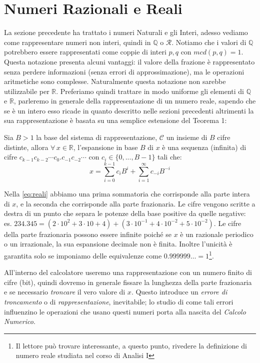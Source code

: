 \section{Numeri Razionali e Reali}

La sezione precedente ha trattato i numeri Naturali e gli Interi, adesso
vediamo come rappresentare numeri non interi, quindi in $\mathbb{Q}$ o
$\mathcal{R}$. Notiamo che i valori di $\mathbb{Q}$ potrebbero essere
rappresentati come coppie di interi $p, q$ con $mcd(p,q) = 1$. Questa notazione
presenta alcuni vantaggi: il valore della frazione è rappresentato senza
perdere informazioni (senza errori di approssimazione), ma le operazioni
aritmetiche sono complesse. Naturalmente questa notazione non sarebbe
utilizzabile per $\mathbb{R}$. Preferiamo quindi trattare in modo uniforme gli
elementi di $\mathbb{Q}$ e $\mathbb{R}$, parleremo in generale della
rappresentazione di un numero reale, sapendo che se è un intero esso ricade in
quanto descritto nelle sezioni precedenti altrimenti la sua rappresentazione è
basata su una semplice estensione del Teorema 1:

\begin{thm}
\label{thm:F}
Sia $B>1$ la base del sistema di rappresentazione, $\mathcal{C}$ un insieme
di $B$ cifre distinte, allora $\forall\, x \in \mathbb{R}$, l'espansione in base $B$ di $x$ è una sequenza (infinita) di cifre $c_{k-1}c_{k-2}{\cdots}c_0\mathbf{.}c_{-1}c_{-2}\cdots$ con $c_i \in \{0,...,B-1\}$ tali che:
\begin{equation}\label{eq:reali}
	x = \sum_{i=0}^{k-1} c_iB^i + \sum_{i=1}^{\infty} c_{-i}B^{-i}
\end{equation}
\end{thm}

Nella \eqref{eq:reali} abbiamo una prima sommatoria che corrisponde alla parte
intera di $x$, e la seconda che corrisponde alla parte frazionaria. Le cifre
vengono scritte a destra di un punto che separa le potenze della base positive
da quelle negative: es. $234.345 =
(2\cdot10^2+3\cdot10+4)+(3\cdot10^{-1}+4\cdot10^{-2}+5\cdot10^{-2})$. Le cifre
della parte frazionaria possono essere infinite poiché se $x$ è un razionale
periodico o un irrazionale, la sua espansione decimale non è finita. Inoltre
l'unicità è garantita solo se imponiamo delle equivalenze come $0.999999\ldots = 1$\footnote{Il lettore può trovare interessante, a questo punto, rivedere la definizione di numero reale studiata nel corso di Analisi I}.

All'interno del calcolatore useremo una rappresentazione con un numero finito
di cifre (bit), quindi dovremo in generale fissare la lunghezza della parte
frazionaria e se necessario \emph{troncare} il vero valore di $x$. Questo
introduce un \emph{errore di troncamento} o di \emph{rappresentazione},
inevitabile; lo studio di come tali errori influenzino le operazioni che
usano questi numeri porta alla nascita del \emph{Calcolo
Numerico}.


